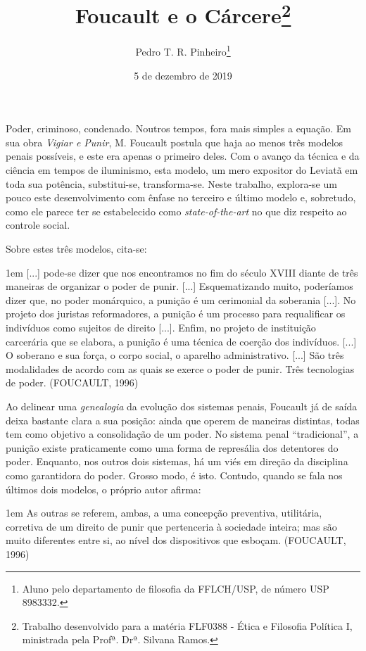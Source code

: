 \documentclass[12pt,a4paper]{article}
\author{Pedro T. R. Pinheiro\footnote{Aluno pelo departamento de filosofia 
da FFLCH/USP, de número USP 8983332. }}
\title{Foucault e o Cárcere\footnote{
	Trabalho desenvolvido para a matéria FLF0388 - Ética e Filosofia 
	Política I, ministrada pela Profª. Drª. Silvana Ramos. }}
\date{5 de dezembro de 2019}
\newenvironment{citac}
{
	\begin{addmargin}
		[4cm]{1em} \footnotesize}{\normalfont 
	\end{addmargin}
}
\begin{document}
	\maketitle
	
	\onehalfspacing
	\setlength{\parskip}{0.5cm}
	
	Poder, criminoso, condenado. Noutros tempos, fora mais simples a 
	equação. Em sua obra \textit{Vigiar e Punir}, M. Foucault postula 
	que haja ao menos três modelos penais possíveis, e este era apenas 
	o primeiro deles. Com o avanço da técnica e da ciência em tempos de 
	iluminismo, esta modelo, um mero expositor do Leviatã em toda sua 
	potência, substitui-se, transforma-se. Neste trabalho, explora-se 
	um pouco este desenvolvimento com ênfase no terceiro e último 
	modelo e, sobretudo, como ele parece ter se estabelecido como 
	\textit{state-of-the-art} no que diz respeito ao controle social. 

	Sobre estes três modelos, cita-se: 
	
	\begin{citac}
		[...] pode-se dizer que nos encontramos no fim do século XVIII 
		diante de três maneiras de organizar o poder de punir. [...] 
		Esquematizando muito, poderíamos dizer que, no poder 
		monárquico, a punição é um cerimonial da soberania [...]. No 
		projeto dos juristas reformadores, a punição é um processo 
		para requalificar os indivíduos como sujeitos de direito 
		[...]. Enfim, no projeto de instituição carcerária que se 
		elabora, a punição é uma técnica de coerção dos indivíduos. 
		[...] O soberano e sua força, o corpo social, o aparelho 
		administrativo. [...] São três modalidades de acordo com 
		as quais se exerce o poder de punir. Três tecnologias de poder. 
		(FOUCAULT, 1996)
	\end{citac}

	Ao delinear uma \emph{genealogia} da evolução dos sistemas penais, 
	Foucault já de saída deixa bastante clara a sua posição: ainda que 
	operem de maneiras distintas, todas tem como objetivo a consolidação 
	de um poder. No sistema penal ``tradicional'', a punição existe 
	praticamente como uma forma de represália dos detentores do poder. 
	Enquanto, nos outros dois sistemas, há um viés em direção da 
	disciplina como garantidora do poder. Grosso modo, é isto. Contudo, 
	quando se fala nos últimos dois modelos, o próprio autor afirma: 
	\newpage %
	\begin{citac}
		As outras se referem, ambas, a uma concepção preventiva, 
		utilitária, corretiva de um direito de punir que pertenceria 
		à sociedade inteira; mas são muito diferentes entre si, ao 
		nível dos dispositivos que esboçam. (FOUCAULT, 1996)
	\end{citac}
\end{document}
